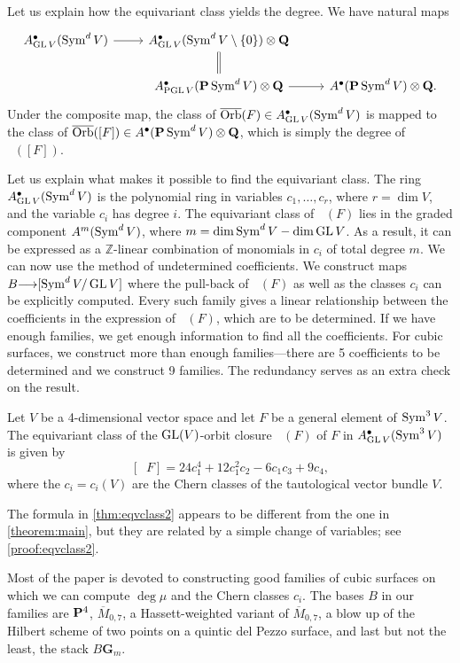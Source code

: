 \documentclass[12pt,reqno]{amsart}
\DeclareMathOperator{\Orb}{\overline{Orb}}
\renewcommand{\to}{{\longrightarrow}}
\numberwithin{equation}{section}
\newcommand{\G}{\mathbf G}
\begin{document}
Let us explain how the equivariant class yields the degree.
We have natural maps
\[
\begin{tikzcd}
  A^\bullet_{\GL V}(\Sym^dV) \ar{r}& A^\bullet_{\GL V}(\Sym^d V \setminus
  \{0\}) \otimes \Q \ar[equal]{d}\\
  &A^\bullet_{\PGL V}(\P \Sym^dV) \otimes \Q \ar{r}&
  A^\bullet(\P \Sym^dV) \otimes \Q.
\end{tikzcd}
\]
Under the composite map, the class of $\Orb(F) \in A^\bullet_{\GL
  V}(\Sym^dV)$ is mapped to the class of $\Orb([F]) \in
A^\bullet(\P \Sym^dV) \otimes \Q$, which is simply the degree of $\Orb([F])$.

Let us explain what makes it possible to find the equivariant
class.  The ring $A^\bullet_{\GL V}(\Sym^dV)$ is the polynomial ring
in variables $c_1, \dots, c_r$, where $r = \dim V$, and the variable
$c_i$ has degree $i$.  The equivariant class of $\Orb(F)$ lies in the
graded component $A^m(\Sym^dV)$, where
$m = \dim \Sym^d V - \dim \GL V$.  As a result, it can be expressed as
a $\mathbb Z$-linear combination of monomials in $c_i$ of total degree
$m$. We can now use the method of undetermined coefficients.  We
construct maps $B \to [\Sym^dV/\GL V]$ where the pull-back of
$\Orb(F)$ as well as the classes $c_i$ can be explicitly
computed. Every such family gives a linear relationship between the
coefficients in the expression of $\Orb(F)$, which are to be determined.
If we have enough families, we get enough information to find all the coefficients.
For cubic surfaces, we construct more than enough families---there are 5
coefficients to be determined and we construct 9 families. The redundancy
serves as an extra check on the result.
\begin{theorem}\label{thm:eqvclass2}
  Let $V$ be a 4-dimensional vector space and let $F$ be a general
  element of $\Sym^3 V$.
  The equivariant class of the $\GL(V)$-orbit closure $\Orb(F)$ of $F$
  in $A^\bullet_{\GL V}(\Sym^3 V)$ is given by
  \[
    [\Orb F] = 24c_1^4 + 12c_1^2c_2 - 6c_1c_3 + 9c_4,
  \]
  where the \(c_i = c_i(V)\) are the Chern classes of the tautological vector
  bundle $V$.
\end{theorem}
The formula in \autoref{thm:eqvclass2} appears to be different from the one
in \autoref{theorem:main}, but they are related by a simple change of
variables; see \autoref{proof:eqvclass2}.

Most of the paper is devoted to constructing good families of cubic
surfaces on which we can compute $\deg \mu$ and the Chern classes
$c_i$. The bases $B$ in our families are $\P^4$, $\overline
M_{0,7}$, a Hassett-weighted variant of $\overline M_{0,7}$, a blow
up of the Hilbert scheme of two points on a quintic del Pezzo surface,
and last but not the least, the stack $B\G_m$.
\end{document}
